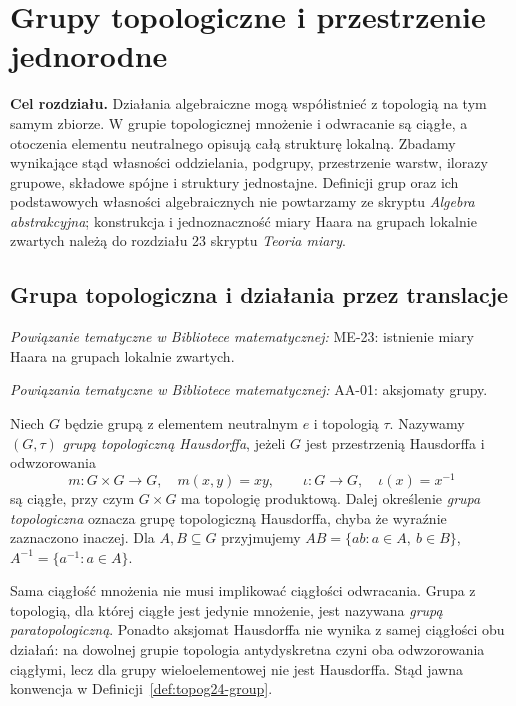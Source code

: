 \chapter{Grupy topologiczne i przestrzenie jednorodne}
\label{ch:topog24-grupy}

\providecommand{\atlasref}[2]{#2}


\noindent\textbf{Cel rozdziału.}
Działania algebraiczne mogą współistnieć z topologią na tym samym
zbiorze. W grupie topologicznej mnożenie i odwracanie są ciągłe,
a otoczenia elementu neutralnego opisują całą strukturę lokalną.
Zbadamy wynikające stąd własności oddzielania, podgrupy, przestrzenie
warstw, ilorazy grupowe, składowe spójne i struktury jednostajne.
Definicji grup oraz ich podstawowych własności algebraicznych nie
powtarzamy ze skryptu \emph{Algebra abstrakcyjna};
konstrukcja i jednoznaczność miary Haara na grupach lokalnie
zwartych należą do rozdziału 23 skryptu \emph{Teoria miary}.

\section{Grupa topologiczna i działania przez translacje}
\label{sec:topog24-definition}

\noindent\emph{Powiązanie tematyczne w Bibliotece matematycznej:} \atlasref{ME-23::thm:haar-main-23}{ME-23: istnienie miary Haara na grupach lokalnie zwartych}.


\noindent\emph{Powiązania tematyczne w Bibliotece matematycznej:} \atlasref{AA-01::aa:def:grupa}{AA-01: aksjomaty grupy}.


\begin{definicja}
\label{def:topog24-group}
Niech \(G\) będzie grupą z elementem neutralnym \(e\)
i topologią \(\tau\). Nazywamy \((G,\tau)\)
\emph{grupą topologiczną Hausdorffa}, jeżeli \(G\)
jest przestrzenią Hausdorffa i odwzorowania
\[
 m\colon G\times G\to G,\quad m(x,y)=xy,
 \qquad
 \iota\colon G\to G,\quad \iota(x)=x^{-1}
\]
są ciągłe, przy czym \(G\times G\) ma topologię
produktową. Dalej określenie \emph{grupa topologiczna}
oznacza grupę topologiczną Hausdorffa, chyba że
wyraźnie zaznaczono inaczej.
Dla \(A,B\subseteq G\) przyjmujemy
\(AB=\{ab:a\in A,\ b\in B\}\),
\(A^{-1}=\{a^{-1}:a\in A\}\).
\end{definicja}

\begin{uwaga}
\label{rem:topog24-continuity}
Sama ciągłość mnożenia nie musi implikować
ciągłości odwracania. Grupa z topologią, dla której
ciągłe jest jedynie mnożenie, jest nazywana
\emph{grupą paratopologiczną}.
Ponadto aksjomat Hausdorffa nie wynika z samej
ciągłości obu działań: na dowolnej grupie
topologia antydyskretna czyni oba odwzorowania
ciągłymi, lecz dla grupy wieloelementowej
nie jest Hausdorffa. Stąd jawna konwencja
w Definicji~\ref{def:topog24-group}.
\end{uwaga}

